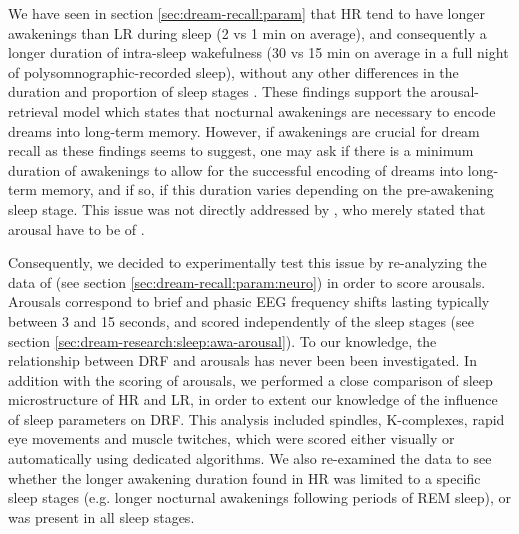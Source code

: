 We have seen in section \ref{sec:dream-recall:param} that HR tend to have longer awakenings than LR during sleep (2 vs 1 min on average), and consequently a longer duration of intra-sleep wakefulness (30 vs 15 min on average in a full night of polysomnographic-recorded sleep), without any other differences in the duration and proportion of sleep stages \citep{eichenlaub_brain_2014}. These findings support the arousal-retrieval model which states that nocturnal awakenings are necessary to encode dreams into long-term memory. However, if awakenings are crucial for dream recall as these findings seems to suggest, one may ask if there is a minimum duration of awakenings to allow for the successful encoding of dreams into long-term memory, and if so, if this duration varies depending on the pre-awakening sleep stage. This issue was not directly addressed by \citet{koulack_dream_1976}, who merely stated that arousal have to be of .

Consequently, we decided to experimentally test this issue by re-analyzing the data of \citet{eichenlaub_brain_2014} (see section \ref{sec:dream-recall:param:neuro}) in order to score arousals. Arousals correspond to brief and phasic EEG frequency shifts lasting typically between 3 and 15 seconds, and scored independently of the sleep stages (see section \ref{sec:dream-research:sleep:awa-arousal}). To our knowledge, the relationship between DRF and arousals has never been been investigated. In addition with the scoring of arousals, we performed a close comparison of sleep microstructure of HR and LR, in order to extent our knowledge of the influence of sleep parameters on DRF. This analysis included spindles, K-complexes, rapid eye movements and muscle twitches, which were scored either visually or automatically using dedicated algorithms. We also re-examined the data to see whether the longer awakening duration found in HR was limited to a specific sleep stages (e.g. longer nocturnal awakenings following periods of REM sleep), or was present in all sleep stages.

